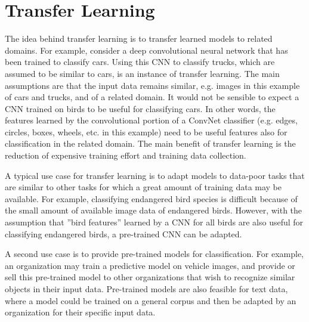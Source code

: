 \section{Transfer Learning}

The idea behind transfer learning is to transfer learned models to related domains. For example, consider a deep convolutional neural network that has been trained to classify cars. Using this CNN to classify trucks, which are assumed to be similar to cars, is an instance of transfer learning. The main assumptions are that the input data remains similar, e.g. images in this example of cars and trucks, and of a related domain. It would not be sensible to expect a CNN trained on birds to be useful for classifying cars. In other words, the features learned by the convolutional portion of a ConvNet classifier (e.g. edges, circles, boxes, wheels, etc. in this example) need to be useful features also for classification in the related domain. The main benefit of transfer learning is the reduction of expensive training effort and training data collection. 

A typical use case for transfer learning is to adapt models to data-poor tasks that are similar to other tasks for which a great amount of training data may be available. For example, classifying endangered bird species is difficult because of the small amount of available image data of endangered birds. However, with the assumption that ''bird features'' learned by a CNN for all birds are also useful for classifying endangered birds, a pre-trained CNN can be adapted. 

A second use case is to provide pre-trained models for classification. For example, an organization may train a predictive model on vehicle images, and provide or sell this pre-trained model to other organizations that wish to recognize similar objects in their input data. Pre-trained models are also feasible for text data, where a model could be trained on a general corpus and then be adapted by an organization for their specific input data. 

